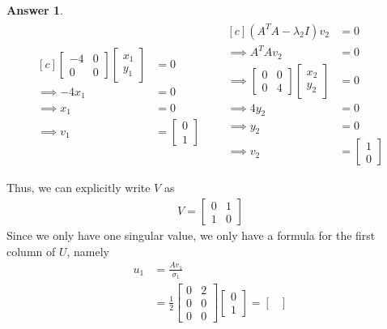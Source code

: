 \documentclass[10pt,a4paper]{article}
\theoremstyle{definition}
\newtheorem*{answer*}{Answer}
\theoremstyle{definition}
\numberwithin{equation}{section}
\begin{document}
\begin{answer*}
\begin{align*}
\begin{aligned}[c]
\begin{bmatrix}
-4 & 0\\
0 & 0
\end{bmatrix} \begin{bmatrix}
x_1\\y_1
\end{bmatrix} &= 0\\
\implies -4x_1 &= 0\\
\implies x_1 &= 0\\
\implies v_1 &= \begin{bmatrix}
0\\1
\end{bmatrix}
\end{aligned}
&& \begin{aligned}[c]
(A^T A - \lambda_2 I)v_2 &= 0\\
\implies A^TA v_2 &= 0\\
\implies \begin{bmatrix}
0 & 0\\
0 & 4
\end{bmatrix} \begin{bmatrix}
x_2\\y_2
\end{bmatrix} &= 0\\
\implies 4y_2 &= 0\\
\implies y_2 &= 0\\
\implies v_2 &= \begin{bmatrix}
1\\0
\end{bmatrix}\\
\end{aligned}\\
\end{align*}
Thus, we can explicitly write $V$ as
\begin{align*}
 V = \begin{bmatrix}
0 & 1\\
1 & 0
\end{bmatrix}
\end{align*}
Since we only have one singular value, we only have a formula for the first column of $U$, namely
\begin{align*}
u_1 &= \frac{Av_1}{\sigma_1}\\
&= \frac{1}{2} \begin{bmatrix}
0 & 2\\
0 & 0\\
0 & 0
\end{bmatrix} \begin{bmatrix}
0\\1
\end{bmatrix} = \begin{bmatrix}

\end{bmatrix}
\end{align*}
\end{answer*}
\end{document}
